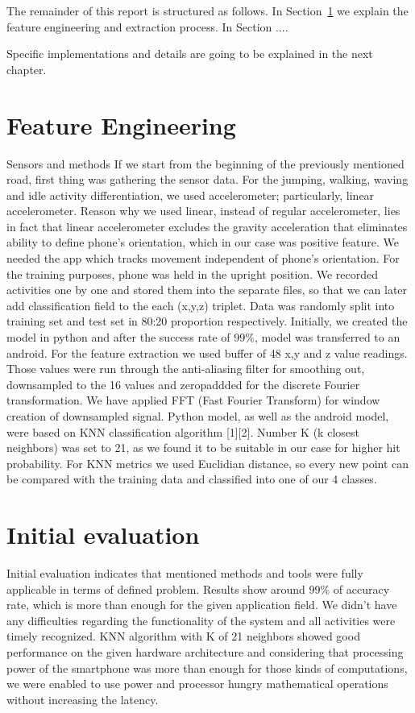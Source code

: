 \documentclass[conference]{IEEEtran}
\begin{document}
The remainder of this report is structured as follows. In Section~\ref{sec:features} we explain the feature engineering and extraction process. In Section ....

Specific implementations and details are going to be explained in the next chapter.

\section{Feature Engineering}
\label{sec:features}

Sensors and methods
If we start from the beginning of the previously mentioned road, first thing was gathering the sensor
data. For the jumping, walking, waving and idle activity differentiation, we used accelerometer;
particularly, linear accelerometer. Reason why we used linear, instead of regular accelerometer, lies in
fact that linear accelerometer excludes the gravity acceleration that eliminates ability to define phone’s
orientation, which in our case was positive feature. We needed the app which tracks movement
independent of phone’s orientation. For the training purposes, phone was held in the upright position.
We recorded activities one by one and stored them into the separate files, so that we can later add
classification field to the each (x,y,z) triplet. Data was randomly split into training set and test set in
80:20 proportion respectively. Initially, we created the model in python and after the success rate of
99\%, model was transferred to an android. For the feature extraction we used buffer of 48 x,y and z
value readings. Those values were run through the anti-aliasing filter for smoothing out, downsampled
to the 16 values and zeropaddded for the discrete Fourier transformation. We have applied FFT (Fast
Fourier Transform) for window creation of downsampled signal. Python model, as well as the android
model, were based on KNN classification algorithm [1][2]. Number K (k closest neighbors) was set to 21,
as we found it to be suitable in our case for higher hit probability. For KNN metrics we used Euclidian
distance, so every new point can be compared with the training data and classified into one of our 4
classes.


\section{Initial evaluation}

Initial evaluation indicates that mentioned methods and tools were fully applicable in terms of defined
problem. Results show around 99\% of accuracy rate, which is more than enough for the given
application field. We didn’t have any difficulties regarding the functionality of the system and all
activities were timely recognized. KNN algorithm with K of 21 neighbors showed good performance on
the given hardware architecture and considering that processing power of the smartphone was more
than enough for those kinds of computations, we were enabled to use power and processor hungry
mathematical operations without increasing the latency.
\end{document}

